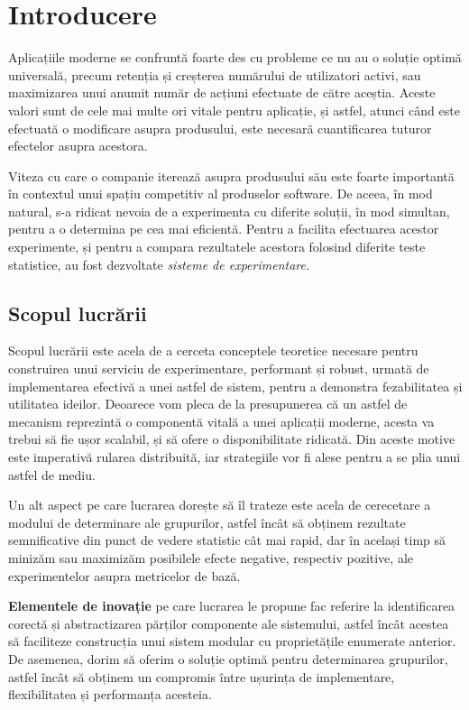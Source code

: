\chapter{Introducere}

Aplicațiile moderne se confruntă foarte des cu probleme ce nu au o soluție optimă universală, precum retenția și creșterea numărului de utilizatori activi, sau maximizarea unui anumit număr de acțiuni efectuate de către aceștia. Aceste valori sunt de cele mai multe ori vitale pentru aplicație, și astfel, atunci când este efectuată o modificare asupra produsului, este necesară cuantificarea tuturor efectelor asupra acestora.

Viteza cu care o companie iterează asupra produsului său este foarte importantă în contextul unui spațiu competitiv al produselor software. De aceea, în mod natural, s-a ridicat nevoia de a experimenta cu diferite soluții, în mod simultan, pentru a o determina pe cea mai eficientă. Pentru a facilita efectuarea acestor experimente, și pentru a compara rezultatele acestora folosind diferite teste statistice, au fost dezvoltate \textit{sisteme de experimentare. }

\section{Scopul lucrării}

Scopul lucrării este acela de a cerceta conceptele teoretice necesare pentru construirea unui serviciu de experimentare, performant și robust, urmată de implementarea efectivă a unei astfel de sistem, pentru a demonstra fezabilitatea și utilitatea ideilor. Deoarece vom pleca de la presupunerea că un astfel de mecanism reprezintă o componentă vitală a unei aplicații moderne, acesta va trebui să fie ușor scalabil, și să ofere o disponibilitate ridicată. Din aceste motive este imperativă rularea distribuită, iar strategiile vor fi alese pentru a se plia unui astfel de mediu.

Un alt aspect pe care lucrarea dorește să îl trateze este acela de cerecetare a modului de determinare ale grupurilor, astfel încât să obținem rezultate semnificative din punct de vedere statistic cât mai rapid, dar în același timp să minizăm sau maximizăm posibilele efecte negative, respectiv pozitive, ale experimentelor asupra metricelor de bază. 

\textbf{Elementele de inovație} pe care lucrarea le propune fac referire la identificarea corectă și abstractizarea părților componente ale sistemului, astfel încât acestea să faciliteze construcția unui sistem modular cu proprietățile enumerate anterior. De asemenea, dorim să oferim o soluție optimă pentru determinarea grupurilor, astfel încât să obținem un compromis între ușurința de implementare, flexibilitatea și performanța acesteia.


